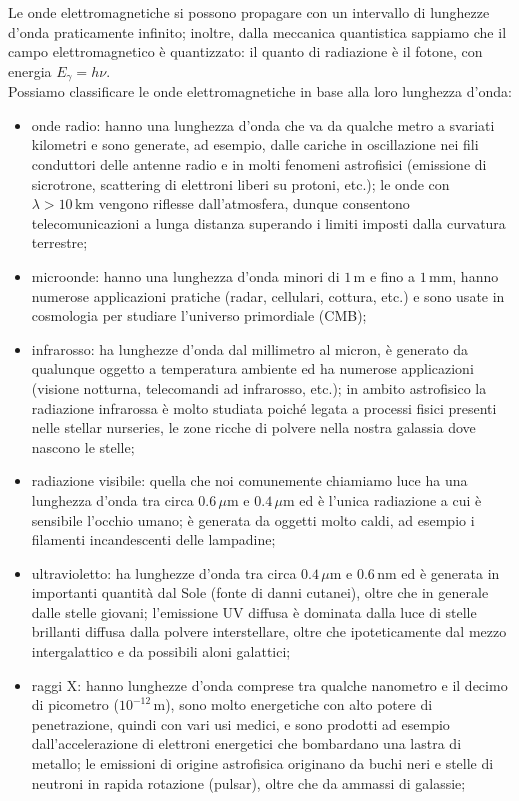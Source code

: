 Le onde elettromagnetiche si possono propagare con un intervallo di lunghezze d'onda praticamente infinito; inoltre, dalla meccanica quantistica sappiamo che il campo elettromagnetico è quantizzato: il quanto di radiazione è il fotone, con energia $ E_{\gamma} = h\nu $. \\ 
Possiamo classificare le onde elettromagnetiche in base alla loro lunghezza d'onda:
\begin{itemize}
	\item onde radio: hanno una lunghezza d'onda che va da qualche metro a svariati kilometri e sono generate, ad esempio, dalle cariche in oscillazione nei fili conduttori delle antenne radio e in molti fenomeni astrofisici (emissione di sicrotrone, scattering di elettroni liberi su protoni, etc.); le onde con $ \lambda > 10\,\text{km} $ vengono riflesse dall'atmosfera, dunque consentono telecomunicazioni a lunga distanza superando i limiti imposti dalla curvatura terrestre;
	\item microonde: hanno una lunghezza d'onda minori di $ 1\,\text{m} $ e fino a $ 1\,\text{mm} $, hanno numerose applicazioni pratiche (radar, cellulari, cottura, etc.) e sono usate in cosmologia per studiare l'universo primordiale (CMB);
	\item infrarosso:  ha lunghezze d'onda dal millimetro al micron, è generato da qualunque oggetto a temperatura ambiente ed ha numerose applicazioni (visione notturna, telecomandi ad infrarosso, etc.); in ambito astrofisico la radiazione infrarossa è molto studiata poiché legata a processi fisici presenti nelle stellar nurseries, le zone ricche di polvere nella nostra galassia dove nascono le stelle;
	\item radiazione visibile: quella che noi comunemente chiamiamo luce ha una lunghezza d'onda tra circa $ 0.6\,\mu\text{m} $ e $ 0.4\,\mu\text{m} $ ed è l'unica radiazione a cui è sensibile l'occhio umano; è generata da oggetti molto caldi, ad esempio i filamenti incandescenti delle lampadine;
	\item ultravioletto: ha lunghezze d'onda tra circa $ 0.4 \,\mu\text{m} $ e $ 0.6 \,\text{nm} $ ed è generata in importanti quantità dal Sole (fonte di danni cutanei), oltre che in generale dalle stelle giovani; l'emissione UV diffusa è dominata dalla luce di stelle brillanti diffusa dalla polvere interstellare, oltre che ipoteticamente dal mezzo intergalattico e da possibili aloni galattici;
	\item raggi X: hanno lunghezze d'onda comprese tra qualche nanometro e il decimo di picometro ($ 10^{-12}\,\text{m} $), sono molto energetiche con alto potere di penetrazione, quindi con vari usi medici, e sono prodotti ad esempio dall'accelerazione di elettroni energetici che bombardano una lastra di metallo; le emissioni di origine astrofisica originano da buchi neri e stelle di neutroni in rapida rotazione (pulsar), oltre che da ammassi di galassie;

\end{itemize}
